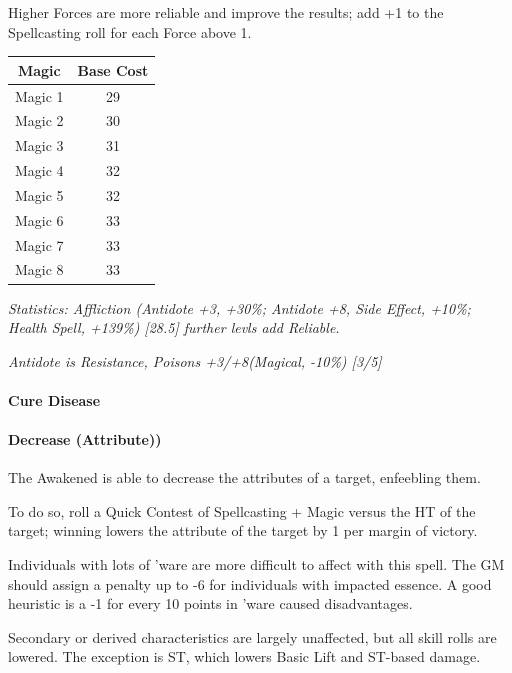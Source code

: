 \begin{multicols}{3}
	Higher Forces are more reliable and improve the results; add +1 to the Spellcasting roll for each Force above 1.
	
	\begin{center}
		\begin{tabular}{|c|c|}
			\hline
			Magic & Base Cost \\
			\hline
			\hline
			Magic 1 & 29 \\
			Magic 2 & 30 \\
			Magic 3 & 31 \\
			Magic 4 & 32 \\
			Magic 5 & 32 \\
			Magic 6 & 33 \\
			Magic 7 & 33 \\
			Magic 8 & 33 \\
			\hline
		\end{tabular}
	\end{center}
	
	\textcolor{OliveGreen}{\textit{Statistics: Affliction (Antidote +3, +30\%; Antidote +8, Side Effect, +10\%; Health Spell, +139\%) [28.5] further levls add Reliable. }}
	
	\textcolor{OliveGreen}{\textit{Antidote is Resistance, Poisons +3/+8(Magical, -10\%) [3/5] }}
	
	\paragraph{Cure Disease}
	
	
	\paragraph{Decrease (Attribute))}
	
	The Awakened is able to decrease the attributes of a target, enfeebling them.
	
	To do so, roll a Quick Contest of Spellcasting + Magic versus the HT of the target; winning lowers the attribute of the target by 1 per margin of victory.	
	
	Individuals with lots of 'ware are more difficult to affect with this spell. The GM should assign a penalty up to -6 for individuals with impacted essence. A good heuristic is a -1 for every 10 points in 'ware caused disadvantages.
	
	Secondary or derived characteristics are largely unaffected, but all skill rolls are lowered. The exception is ST, which lowers Basic Lift and ST-based damage.
	

\end{multicols}
